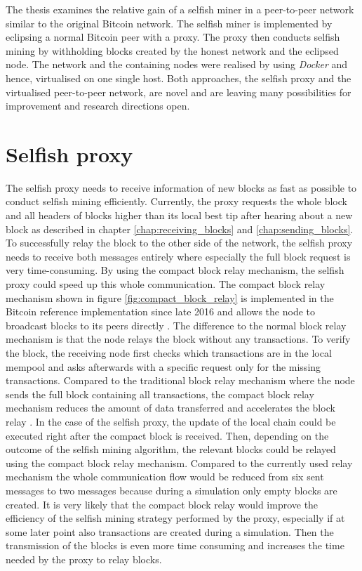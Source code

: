 The thesis examines the relative gain of a selfish miner in a peer-to-peer network similar to the original Bitcoin network.
The selfish miner is implemented by eclipsing a normal Bitcoin peer with a proxy.
The proxy then conducts selfish mining by withholding blocks created by the honest network and the eclipsed node.
The network and the containing nodes were realised by using \textit{Docker} and hence, virtualised on one single host.
Both approaches, the selfish proxy and the virtualised peer-to-peer network, are novel and are leaving many possibilities for improvement and research directions open.

\section{Selfish proxy}

The selfish proxy needs to receive information of new blocks as fast as possible to conduct selfish mining efficiently.
Currently, the proxy requests the whole block and all headers of blocks higher than its local best tip after hearing about a new block as described in chapter \ref{chap:receiving_blocks} and \ref{chap:sending_blocks}.
To successfully relay the block to the other side of the network, the selfish proxy needs to receive both messages entirely where especially the full block request is very time-consuming.
By using the compact block relay mechanism, the selfish proxy could speed up this whole communication.
The compact block relay mechanism shown in figure \ref{fig:compact_block_relay} is implemented in the Bitcoin reference implementation since late 2016 \cite{bitcoin13} and allows the node to broadcast blocks to its peers directly \cite{bip152}.
The difference to the normal block relay mechanism is that the node relays the block without any transactions.
To verify the block, the receiving node first checks which transactions are in the local mempool and asks afterwards with a specific request only for the missing transactions.
Compared to the traditional block relay mechanism where the node sends the full block containing all transactions, the compact block relay mechanism reduces the amount of data transferred and accelerates the block relay \cite{bip152, ozisik2017graphene}.
In the case of the selfish proxy, the update of the local chain could be executed right after the compact block is received.
Then, depending on the outcome of the selfish mining algorithm, the relevant blocks could be relayed using the compact block relay mechanism.
Compared to the currently used relay mechanism the whole communication flow would be reduced from six sent messages to two messages because during a simulation only empty blocks are created.
It is very likely that the compact block relay would improve the efficiency of the selfish mining strategy performed by the proxy, especially if at some later point also transactions are created during a simulation.
Then the transmission of the blocks is even more time consuming and increases the time needed by the proxy to relay blocks.

